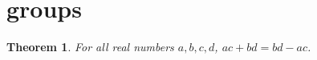\documentclass{article}
\newtheorem{theorem}{Theorem}
\begin{document}
\section{groups}

\begin{theorem}\label{thm:RG03}
For all real numbers $a,b,c,d$, $ac+bd=bd-ac$.
\end{theorem}
\end{document}
